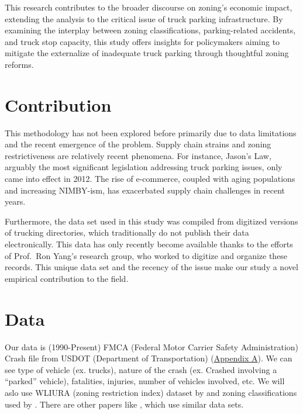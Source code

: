 \documentclass[
  12pt]{article}
\begin{document}
This research contributes to the broader discourse on zoning's economic
impact, extending the analysis to the critical issue of truck parking
infrastructure. By examining the interplay between zoning
classifications, parking-related accidents, and truck stop capacity,
this study offers insights for policymakers aiming to mitigate the
externalize of inadequate truck parking through thoughtful zoning
reforms.

\hypertarget{contribution}{%
\section{Contribution}\label{contribution}}

This methodology has not been explored before primarily due to data
limitations and the recent emergence of the problem. Supply chain
strains and zoning restrictiveness are relatively recent phenomena. For
instance, Jason's Law, arguably the most significant legislation
addressing truck parking issues, only came into effect in 2012. The rise
of e-commerce, coupled with aging populations and increasing NIMBY-ism,
has exacerbated supply chain challenges in recent years.

Furthermore, the data set used in this study was compiled from digitized
versions of trucking directories, which traditionally do not publish
their data electronically. This data has only recently become available
thanks to the efforts of Prof.~Ron Yang's research group, who worked to
digitize and organize these records. This unique data set and the
recency of the issue make our study a novel empirical contribution to
the field.

\hypertarget{data}{%
\section{Data}\label{data}}

Our data is (1990-Present) FMCA (Federal Motor Carrier Safety
Administration) Crash file from USDOT (Department of Transportation)
(\protect\hypertarget{sec:appendix-a}{\protect\hyperlink{sec-a.-visualization-of-dataset.-}{Appendix
A}}). We can see type of vehicle (ex. trucks), nature of the crash (ex.
Crashed involving a ``parked'' vehicle), fatalities, injuries, number of
vehicles involved, etc. We will aslo use WLIURA (zoning restriction
index) dataset by \citet{gyourkoNewMeasureLocal2008} and zoning
classifications used by \citet{puentesTraditionalReformedReview2006} .
There are other papers like \citet{liangSafetyInspectionsImprove2021},
which use similar data sets.
\end{document}
